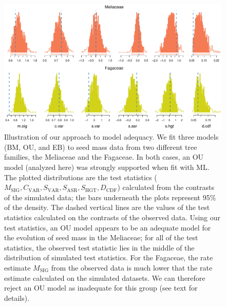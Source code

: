 \documentclass[a4paper,11pt]{article}
\begin{document}
{\begin{figure}[p]
  \centering
  \includegraphics[scale=0.65]{figs/two-clades}
  \caption{Illustration of our approach to model adequacy. We fit three models (BM, OU, and EB) to seed mass data from two different tree families, the Meliaceae and the Fagaceae. In both cases, an OU model (analyzed here) was strongly supported when fit with ML. The plotted distributions are the test statistics ($M_{\text{SIG}}, C_{\text{VAR}}, S_{\text{VAR}}, S_{\text{ASR}}, S_{\text{HGT}}, D_{\text{CDF}}$) calculated from the contrasts of the simulated data; the bars underneath the plots represent 95\% of the density. The dashed vertical lines are the values of the test statistics calculated on the contrasts of the observed data. Using our test statistics, an OU model appears to be an adequate model for the evolution of seed mass in the Meliaceae; for all of the test statistics, the observed test statistic lies in the middle of the distribution of simulated test statistics. For the Fagaceae, the rate estimate $M_{\text{SIG}}$ from the observed data is much lower that the rate estimate calculated on the simulated datasets. We can therefore reject an OU model as inadequate for this group (see text for details).}
  \label{fig:two-clades}
\end{figure}

}
\end{document}
